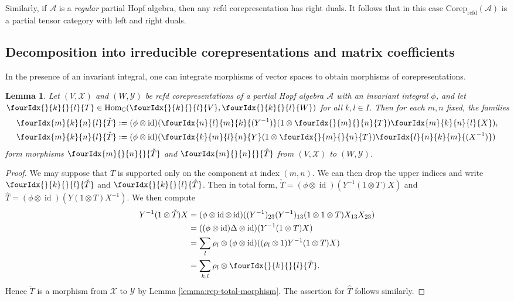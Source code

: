 \documentclass[10pt]{article}
\DeclareMathOperator{\id}{id}
\DeclareMathOperator{\Hom}{Hom}
\DeclareMathOperator{\rcf}{\mathrm{rcfd}}
\newcommand{\Corep}{\mathrm{Corep}}
\newcommand{\C}{\mathbb{C}}
\newcommand{\Gr}[5]{\fourIdx{#2}{#4}{#3}{#5}{#1}}%
\newcommand{\Gru}[3]{\Gr{#1}{}{}{#2}{#3}}
\newcommand{\Grd}[3]{\Gr{#1}{#2}{#3}{}{}}
\newtheorem{Lem}[Theorem]{Lemma}
\theoremstyle{definition}
\numberwithin{equation}{section}
\begin{document}
Similarly, if $\mathscr{A}$ is a \emph{regular} partial Hopf algebra, then any rcfd corepresentation has right duals. It follows that in this case $\Corep_{\rcf}(\mathscr{A})$ is a partial tensor category with left and right duals.


\subsection{Decomposition into irreducible corepresentations and matrix coefficients}

In the presence of an invariant integral, one can integrate morphisms of vector spaces to obtain morphisms of corepresentations. 
\begin{Lem} \label{lem:rep-average}  Let $(V,\mathscr{X})$ and
  $(W,\mathscr{Y})$ be rcfd corepresentations of  a partial
  Hopf algebra $\mathscr{A}$ with an invariant integral $\phi$, and let
  $\Gru{T}{k}{l} \in \Hom_{\C}(\Gru{V}{k}{l},\Gru{W}{k}{l})$ for all $k,l\in I$. Then for each $m,n$ fixed, the families
  \begin{align*}
    \Gr{\check T}{m}{n}{k}{l} &:= (\phi \otimes
    \id)(\Gr{(Y^{-1})}{n}{m}{l}{k}(1\otimes
    \Gru{T}{m}{n})\Gr{X}{m}{n}{k}{l}), \\
    \Gr{\hat T}{m}{n}{k}{l} &:=(\phi \otimes
    \id)(\Gr{Y}{k}{l}{m}{n}(1\otimes
    \Gru{T}{m}{n})\Gr{(X^{-1})}{l}{k}{n}{m})
  \end{align*} %
form  morphisms $\Grd{\check{T}}{m}{n}$ and $\Grd{\hat{T}}{m}{n}$ from $(V,\mathscr{X})$ to $(W,\mathscr{Y})$. 
\end{Lem} 
\begin{proof} We may suppose that $T$ is supported only on the component at index $(m,n)$. We can then drop the upper indices and write $\Gru{\check{T}}{k}{l}$ and $\Gru{\hat{T}}{k}{l}$. Then 
 in total form, $\check{T}=(\phi \otimes \id)(Y^{-1}(1 \otimes T)X)$
  and $\hat{T}=(\phi \otimes \id)(Y(1 \otimes T)X^{-1})$.  We then compute
  \begin{align*}
    Y^{-1}(1 \otimes \check{T})X &= (\phi \otimes \id \otimes
    \id)((Y^{-1})_{23}(Y^{-1})_{13}(1 \otimes 1
    \otimes T)X_{13}X_{23})  \\
    &= ((\phi \otimes\id)  \Delta  \otimes \id)(Y^{-1}(1 \otimes T)X) \\
    &= \sum_{l} \rho_{l} \otimes (\phi \otimes \id)((\rho_{l} \otimes
    1)Y^{-1}(1 \otimes T)X)  \\
    &= \sum_{k,l} \rho_{l} \otimes \Gru{\check T}{k}{l}.
  \end{align*}
  Hence $\check{T}$ is a morphism from $\mathscr{X}$ to $\mathscr{Y}$
  by Lemma \ref{lemma:rep-total-morphism}. The assertion for $\hat
  T$ follows similarly.
\end{proof}
\end{document}
